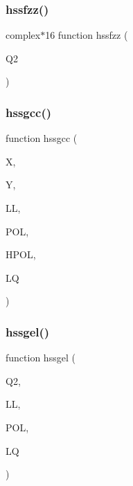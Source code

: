 \mbox{\label{djangoh__h_8f_a58a60617eda31856420c23f87d10fbeb}} 
\subsubsection{\texorpdfstring{hssfzz()}{hssfzz()}}
{\footnotesize\ttfamily complex$\ast$16 function hssfzz (\begin{DoxyParamCaption}\item[{}]{Q2 }\end{DoxyParamCaption})}

\mbox{\label{djangoh__h_8f_ab69b3a52583e8911c01842f23c7c0657}} 
\subsubsection{\texorpdfstring{hssgcc()}{hssgcc()}}
{\footnotesize\ttfamily function hssgcc (\begin{DoxyParamCaption}\item[{}]{X,  }\item[{}]{Y,  }\item[{}]{LL,  }\item[{}]{P\+OL,  }\item[{}]{H\+P\+OL,  }\item[{}]{LQ }\end{DoxyParamCaption})}

\mbox{\label{djangoh__h_8f_a918dcf0a3a5bd7f308fc93c75334a9f4}} 
\subsubsection{\texorpdfstring{hssgel()}{hssgel()}}
{\footnotesize\ttfamily function hssgel (\begin{DoxyParamCaption}\item[{}]{Q2,  }\item[{}]{LL,  }\item[{}]{P\+OL,  }\item[{}]{LQ }\end{DoxyParamCaption})}

